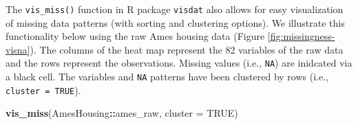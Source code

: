 \documentclass[]{krantz}
\makeatletter
\newenvironment{Shaded}{\begin{snugshade}}{\end{snugshade}}
\newcommand{\CommentTok}[1]{\textcolor[rgb]{0.37,0.37,0.37}{\textit{#1}}}
\newcommand{\DataTypeTok}[1]{\textcolor[rgb]{0.27,0.27,0.27}{#1}}
\newcommand{\KeywordTok}[1]{\textcolor[rgb]{0.27,0.27,0.27}{\textbf{#1}}}
\newcommand{\NormalTok}[1]{#1}
\newcommand{\OperatorTok}[1]{\textcolor[rgb]{0.43,0.43,0.43}{\textbf{#1}}}
\newcommand{\OtherTok}[1]{\textcolor[rgb]{0.37,0.37,0.37}{#1}}
\newcommand{\StringTok}[1]{\textcolor[rgb]{0.5,0.5,0.5}{#1}}
\newenvironment{kframe}{%
\medskip{}
\setlength{\fboxsep}{.8em}
 \def\at@end@of@kframe{}%
 \ifinner\ifhmode%
  \def\at@end@of@kframe{\end{minipage}}%
  \begin{minipage}{\columnwidth}%
 \fi\fi%
 \def\FrameCommand##1{\hskip\@totalleftmargin \hskip-\fboxsep
 \colorbox{shadecolor}{##1}\hskip-\fboxsep
     \hskip-\linewidth \hskip-\@totalleftmargin \hskip\columnwidth}%
 \MakeFramed {\advance\hsize-\width
   \@totalleftmargin\z@ \linewidth\hsize
   \@setminipage}}%
 {\par\unskip\endMakeFramed%
 \at@end@of@kframe}
\renewenvironment{Shaded}{\begin{kframe}}{\end{kframe}}
\makeatother
\begin{document}
\begin{Shaded}
\end{Shaded}

The \texttt{vis\_miss()} function in R package \texttt{visdat} \citep{R-visdat} also allows for easy visualization of missing data patterns (with sorting and clustering options). We illustrate this functionality below using the raw Ames housing data (Figure \ref{fig:missingness-visna}). The columns of the heat map represent the 82 variables of the raw data and the rows represent the observations. Missing values (i.e., \texttt{NA}) are inidcated via a black cell. The variables and \texttt{NA} patterns have been clustered by rows (i.e., \texttt{cluster\ =\ TRUE}).

\begin{Shaded}
\begin{Highlighting}[]
\KeywordTok{vis_miss}\NormalTok{(AmesHousing}\OperatorTok{::}\NormalTok{ames_raw, }\DataTypeTok{cluster =} \OtherTok{TRUE}\NormalTok{)}
\end{Highlighting}
\end{Shaded}
\end{document}
